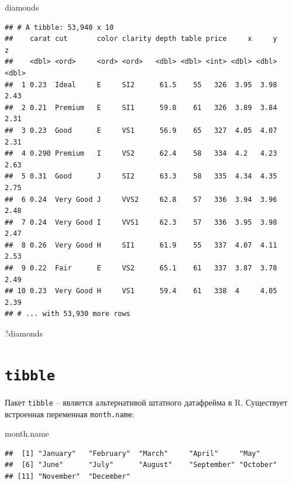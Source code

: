 \documentclass[]{book}
\newenvironment{Shaded}{\begin{snugshade}}{\end{snugshade}}
\newcommand{\NormalTok}[1]{#1}
\begin{document}
\begin{Shaded}
\begin{Highlighting}[]
\NormalTok{diamonds}
\end{Highlighting}
\end{Shaded}

\begin{verbatim}
## # A tibble: 53,940 x 10
##    carat cut       color clarity depth table price     x     y     z
##    <dbl> <ord>     <ord> <ord>   <dbl> <dbl> <int> <dbl> <dbl> <dbl>
##  1 0.23  Ideal     E     SI2      61.5    55   326  3.95  3.98  2.43
##  2 0.21  Premium   E     SI1      59.8    61   326  3.89  3.84  2.31
##  3 0.23  Good      E     VS1      56.9    65   327  4.05  4.07  2.31
##  4 0.290 Premium   I     VS2      62.4    58   334  4.2   4.23  2.63
##  5 0.31  Good      J     SI2      63.3    58   335  4.34  4.35  2.75
##  6 0.24  Very Good J     VVS2     62.8    57   336  3.94  3.96  2.48
##  7 0.24  Very Good I     VVS1     62.3    57   336  3.95  3.98  2.47
##  8 0.26  Very Good H     SI1      61.9    55   337  4.07  4.11  2.53
##  9 0.22  Fair      E     VS2      65.1    61   337  3.87  3.78  2.49
## 10 0.23  Very Good H     VS1      59.4    61   338  4     4.05  2.39
## # ... with 53,930 more rows
\end{verbatim}

\begin{Shaded}
\begin{Highlighting}[]
\NormalTok{?diamonds}
\end{Highlighting}
\end{Shaded}

\hypertarget{tibble}{%
\section{\texorpdfstring{\texttt{tibble}}{tibble}}\label{tibble}}

Пакет \texttt{tibble} -- является альтернативой штатного датафрейма в R. Существует встроенная переменная \texttt{month.name}:

\begin{Shaded}
\begin{Highlighting}[]
\NormalTok{month.name}
\end{Highlighting}
\end{Shaded}

\begin{verbatim}
##  [1] "January"   "February"  "March"     "April"     "May"      
##  [6] "June"      "July"      "August"    "September" "October"  
## [11] "November"  "December"
\end{verbatim}
\end{document}

